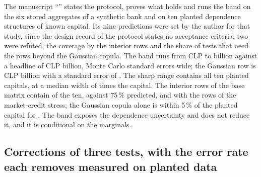The manuscript ``\pxPaperTitleNine{}'' states the protocol, proves what holds and runs the band on the six stored aggregates of a synthetic bank and on ten planted dependence structures of known
capital. Its nine predictions were set by the author for that study, since the design record of the protocol states no acceptance criteria; two were refuted, the coverage by the interior rows and the share
of tests that need the rows beyond the Gaussian copula. The band runs from CLP \pxPpNineLower{} to \pxPpNineWorst{} billion against a headline of CLP \pxPpNineHeadline{} billion, \pxPpNineWidthSe{} Monte
Carlo standard errors wide; the Gaussian row is CLP \pxPpNineGauss{} billion with a standard error of \pxPpNineGaussSe{}. The sharp range contains all ten planted capitals, at a median width of
\pxPpNineWidth{} times the capital. The interior rows of the base matrix contain \pxPpNineInterior{} of the ten, against 75\,\% predicted, and \pxPpNineInteriorStress{} with the rows of the market-credit
stress; the Gaussian copula alone is within 5\,\% of the planted capital for \pxPpNineGaussWithin{}. The band exposes the dependence uncertainty and does not reduce it, and it is conditional on the marginals.

\subsection{Corrections of three tests, with the error rate each removes measured on planted data}
\label{sec:bs10}

